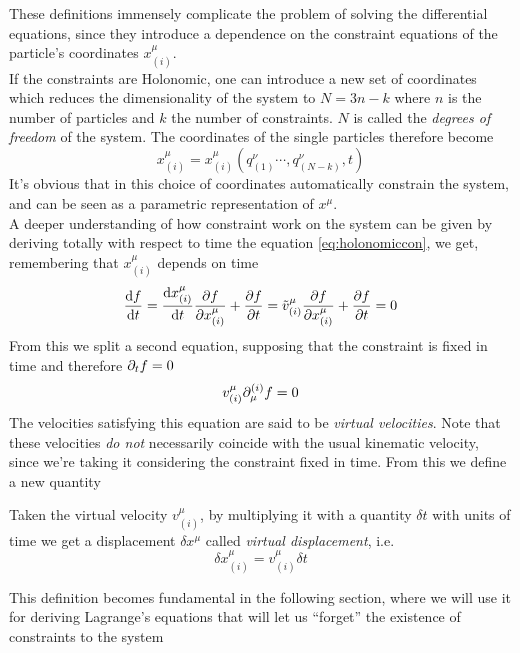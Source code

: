 \documentclass[../admech.tex]{subfiles}
\begin{document}
These definitions immensely complicate the problem of solving the differential equations, since they introduce a dependence on the constraint equations of the particle's coordinates $x^\mu_{(i)}$.\\
If the constraints are Holonomic, one can introduce a new set of coordinates which reduces the dimensionality of the system to $N=3n-k$ where $n$ is the number of particles and $k$ the number of constraints. $N$ is called the \emph{degrees of freedom} of the system. The coordinates of the single particles therefore become
\begin{equation}
	x^\mu_{(i)}=x^\mu_{(i)}(q^\nu_{(1)}\cdots,q^\nu_{(N-k)},t)
	\label{eq:gencoords}
\end{equation}
It's obvious that in this choice of coordinates automatically constrain the system, and can be seen as a parametric representation of $x^\mu$.\\
A deeper understanding of how constraint work on the system can be given by deriving totally with respect to time the equation \eqref{eq:holonomiccon}, we get, remembering that $x^\mu_{(i)}$ depends on time
\begin{equation}
	\dv{f}{t}=\dv{x^\mu_{(i)}}{t}\pdv{f}{x^\mu_{(i)}}+\pdv{f}{t}=\tilde{v}^\mu_{(i)}\pdv{f}{x^\mu_{(i)}}+\pdv{f}{t}=0
	\label{eq:derholvinc}
\end{equation}
From this we split a second equation, supposing that the constraint is fixed in time and therefore $\partial_tf=0$
\begin{equation}
	v^\mu_{(i)}\partial_\mu^{(i)}f=0
	\label{eq:vvel}
\end{equation}
The velocities satisfying this equation are said to be \emph{virtual velocities}. Note that these velocities \emph{do not} necessarily coincide with the usual kinematic velocity, since we're taking it considering the constraint fixed in time. From this we define a new quantity
\begin{dfn}
	Taken the virtual velocity $v^\mu_{(i)}$, by multiplying it with a quantity $\delta t$ with units of time we get a displacement $\delta x^\mu$ called \emph{virtual displacement}, i.e.
	\begin{equation}
		\delta x^\mu_{(i)}=v^\mu_{(i)}\delta t
		\label{eq:vdisp}
	\end{equation}
\end{dfn}
This definition becomes fundamental in the following section, where we will use it for deriving Lagrange's equations that will let us ``forget'' the existence of constraints to the system
\end{document}
